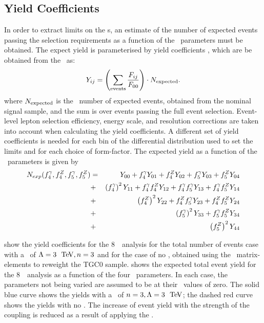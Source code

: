 \subsection{Yield Coefficients}
\label{sec:TGC-YieldCoefficients}

In order to extract limits on the \TGC s, an estimate of the number of expected
events passing the selection requirements as a
function of the \TGC\ parameters must be obtained. The expect yield is parameterised by
yield coefficients \Yij, which are be obtained from the \Fij\ as:
\begin{equation}
Y_{ij} = \left( \sum_{\rm events} \frac{F_{ij}}{F_{00} } \right) \cdot{N_{\rm expected}}.
\end{equation}
where $N_{\rm expected}$ is the \sm\ number of expected events, obtained from the
nominal signal sample, and the sum is over events passing the full event
selection. Event-level lepton selection efficiency, energy scale, and resolution corrections
are taken into account when calculating the yield coefficients. A different set of yield
coefficients is needed for each bin of the differential distribution used to set
the limits and for each choice of
form-factor. The expected yield as a function of the \TGC\ parameters is given by
\begin{eqnarray}\label{eqn:Nexp_TGC}
N_{exp} (f_{4}^{\gamma}, f_{4}^{Z}, f_{5}^{\gamma}, f_{5}^{Z}) & = & Y_{00} + f_4^\gamma Y_{01} + f_4^Z Y_{02} + f_5^\gamma Y_{03} + f_5^Z Y_{04}  \nonumber \\
&+& \left(f_4^\gamma\right)^2Y_{11} + f_4^\gamma f_4^Z Y_{12} +  f_4^\gamma f_5^\gamma Y_{13} + f_4^\gamma f_5^Z Y_{14}  \nonumber \\
&+& \left(f_4^Z\right)^2Y_{22} + f_4^Zf_5^\gamma Y_{23} + f_4^Zf_5^Z Y_{24}  \nonumber \\
&+& \left(f_5^\gamma\right)^2Y_{33} + f_5^\gamma f_5^Z Y_{34} \nonumber \\
&+& \left(f_5^Z\right)^2Y_{44}
\end{eqnarray}

 show the yield
coefficients for the 8~\tev\ analysis for the total number of events case with a
\formfactor\ of $\Lambda=3~\tev, n=3$ and for the case of no \formfactor,
obtained using the \BR\ matrix-elements to reweight the TGC0 sample.  
shows the expected total event yield for the 8~\tev\ analysis as a function of
the four \TGC\ parameters. In each case, the parameters not being varied are
assumed to be at their \sm\ values of zero.
The solid blue curve shows the yields with a \formfactor\ of $n=3, \Lambda=3~\tev$;
the dashed red curve shows the yields with no \formfactor. The increase of event
yield with the strength of the coupling is reduced as a result of applying the
\formfactor.

